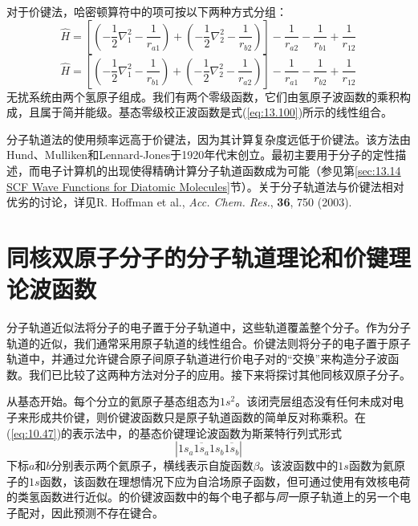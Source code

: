     对于价键法，哈密顿算符中的项可按以下两种方式分组：
    \begin{equation*}
        \hat{H} = \left[ \left( -\frac{1}{2}\nabla_1^2 - \frac{1}{r_{a1}} \right) + \left( -\frac{1}{2}\nabla_2^2 - \frac{1}{r_{b2}} \right) \right] - \frac{1}{r_{a2}} - \frac{1}{r_{b1}} + \frac{1}{r_{12}}
    \end{equation*}
    \begin{equation*}
        \hat{H} = \left[ \left( -\frac{1}{2} \nabla_1^2 - \frac{1}{r_{b1}} \right) + \left( -\frac{1}{2} \nabla_2^2 - \frac{1}{r_{a2}} \right) \right] - \frac{1}{r_{a1}} - \frac{1}{r_{b2}} + \frac{1}{r_{12}}
    \end{equation*}
    无扰系统由两个氢原子组成。我们有两个零级函数，它们由氢原子波函数的乘积构成，且属于简并能级。基态零级校正波函数是式(\ref{eq:13.100})所示的线性组合。

    分子轨道法的使用频率远高于价键法，因为其计算复杂度远低于价键法。该方法由Hund、Mulliken和Lennard-Jones于1920年代末创立。最初主要用于分子的定性描述，而电子计算机的出现使得精确计算分子轨道函数成为可能（参见第\ref{sec:13.14 SCF Wave Functions for Diatomic Molecules}节）。关于分子轨道法与价键法相对优劣的讨论，详见R. Hoffman et al., \textit{Acc. Chem. Res.}, \textbf{36}, 750 (2003).

\section{同核双原子分子的分子轨道理论和价键理论波函数}
\label{sec:13.12 MO and VB Wave Functions for Homonuclear Diatomic Molecules}

    分子轨道近似法将分子的电子置于分子轨道中，这些轨道覆盖整个分子。作为分子轨道的近似，我们通常采用原子轨道的线性组合。价键法则将分子的电子置于原子轨道中，并通过允许键合原子间原子轨道进行价电子对的“交换”来构造分子波函数。我们已比较了这两种方法对分子的应用。接下来将探讨其他同核双原子分子。

    从基态开始。每个分立的氦原子基态组态为$1s^2$。该闭壳层组态没有任何未成对电子来形成共价键，则价键波函数只是原子轨道函数的简单反对称乘积。在(\ref{eq:10.47})的表示法中，的基态价键理论波函数为斯莱特行列式形式
    \begin{equation}
        \left|1s_a\overline{1s_a}1s_b\overline{1s_b}\right|
        \label{eq:13.110}
    \end{equation}
    下标$a$和$b$分别表示两个氦原子，横线表示自旋函数$\beta$。该波函数中的$1s$函数为氦原子的$1s$函数，该函数在理想情况下应为自洽场原子函数，但可通过使用有效核电荷的类氢函数进行近似。的价键波函数中的每个电子都与\textit{同一}原子轨道上的另一个电子配对，因此预测不存在键合。

